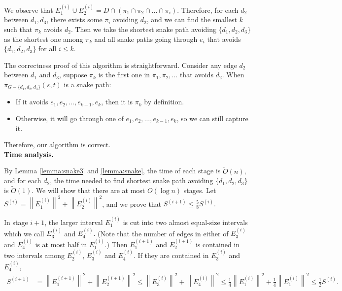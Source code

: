 \documentclass[11pt]{article}
\theoremstyle{plain}
\theoremstyle{definition}
\newcommand{\too}[1]{\tilde{O}({#1})}
\newcommand{\set}[1]{\{ #1 \}}
\newcommand{\og}[3]{\pi_{G-#3}\left(#1,#2\right)}
\begin{document}
\begin{itemize}
\begin{center}
\begin{tikzpicture}[x=0.75pt,y=0.75pt,yscale=-1,xscale=1]
\end{tikzpicture}
 \end{center}

\end{itemize}

We observe that $E_1^{(i)} \cup E_2^{(i)}=D\cap (\pi_1 \cap \pi_2 \cap \dots \cap \pi_i)$. Therefore, for each $d_2$ between $d_1,d_3$, there exists some $\pi_i$ avoiding $d_2$, and we can find the smallest $k$ such that $\pi_k$ avoids $d_2$. Then we take the shortest snake path avoiding $\{d_1,d_2,d_3\}$ as the shortest one among $\pi_k$ and all snake paths going through $e_i$ that avoids $\{d_1,d_2,d_3\}$ for all $i\leq k$.



The correctness proof of this algorithm is straightforward. Consider any 
edge $d_2$ between $d_1$ and $d_3$, suppose $\pi_k$ is the first one in $\pi_1, \pi_2, \dots$ that avoids $d_2$. When $\og{s}{t}{\set{d_1, d_2, d_3}}$ is a snake path:

\begin{itemize}
    \item If it avoids $e_1,e_2, \dots, e_{k-1},e_k$, then it is $\pi_k$ by definition. 
    \item Otherwise, it will go through one of $e_1,e_2, \dots, e_{k-1},e_k$, so we can still capture it.
\end{itemize}

Therefore, our algorithm is correct.
\\

\noindent\textbf{Time analysis.}

By Lemma \ref{lemma:snake3} and \ref{lemma:snake}, the time of each stage is $\too{n}$, and for each $d_2$, the time needed to find shortest snake path avoiding $\set{d_1, d_2, d_3}$ is $\too{1}$. We will show that there are at most $O(\log{n})$ stages. Let $S^{(i)}= {\left\| E_1^{(i)}\right\|}^2+{\left\| E_2^{(i)}\right\|}^2$, and we prove that $S^{(i+1)}\le\frac{5}{8}S^{(i)}.$

In stage $i+1$, the larger interval $E_1^{(i)}$ is cut into two almost equal-size intervals which we call $E_3^{(i)}$ and $E_4^{(i)}.$ (Note that the number of edges in either of $E_3^{(i)}$ and $E_4^{(i)}$ is at most half in $E_1^{(i)}$.) Then $E_1^{(i+1)}$ and $E_2^{(i+1)}$ is contained in two intervals among $E_2^{(i)}$, $E_3^{(i)}$ and $E_4^{(i)}.$ If they are contained in $E_3^{(i)}$ and $E_4^{(i)}$,
\begin{equation*}
\begin{split}
    S^{(i+1)}&={\left\| E_1^{(i+1)}\right\|}^2+{\left\| E_2^{(i+1)}\right\|}^2
    \le{\left\| E_3^{(i)}\right\|}^2+{\left\| E_4^{(i)}\right\|}^2
    \le\frac{1}{4}{\left\| E_1^{(i)}\right\|}^2+\frac{1}{4}{\left\| E_1^{(i)}\right\|}^2
    \le\frac{1}{2}S^{(i)}.\\
\end{split}
\end{equation*}
\end{document}
